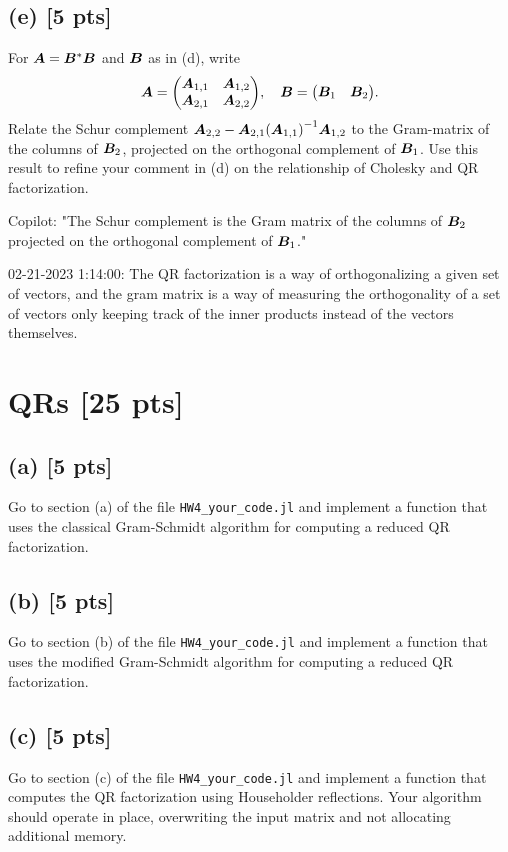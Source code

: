 \documentclass[twoside,10pt]{article}
\begin{document}
\subsection*{(e) [5 pts]} 
For $\bm{A} = \bm{B}^* \bm{B}$ and $\bm{B}$ as in (d), write 
\begin{equation}
\mtx{A} = 
\begin{pmatrix}
 \mtx{A}_{1,1}& \mtx{A}_{1,2} \\
 \mtx{A}_{2,1}& \mtx{A}_{2,2} 
\end{pmatrix}, 
\quad 
\mtx{B} = 
\begin{pmatrix}
 \mtx{B}_{1} &  \mtx{B}_{2} 
\end{pmatrix}. 
\end{equation}
Relate the Schur complement $\mtx{A}_{2,2} - \mtx{A}_{2,1} \left(\mtx{A}_{1, 1}\right)^{-1} \mtx{A}_{1,2}$ to the Gram-matrix of the columns of $\bm{B}_2$, projected on the orthogonal complement of $\bm{B}_1$.
Use this result to refine your comment in (d) on the relationship of Cholesky and QR factorization. 

Copilot: "The Schur complement is the Gram matrix of the columns of $\bm{B}_2$ projected on the orthogonal complement of $\bm{B}_1$."

02-21-2023 1:14:00: The QR factorization is a way of orthogonalizing a given set of vectors, and the gram matrix is a way of measuring the orthogonality of a set of vectors only keeping track of the inner products instead of the vectors themselves.

\section{QRs [25 pts]}
\subsection*{(a) [5 pts]} 
Go to section (a) of the file \texttt{HW4\_your\_code.jl} and implement a function that uses the classical Gram-Schmidt algorithm for computing a reduced QR factorization. 

\subsection*{(b) [5 pts]} 
Go to section (b) of the file \texttt{HW4\_your\_code.jl} and implement a function that uses the modified Gram-Schmidt algorithm for computing a reduced QR factorization. 


\subsection*{(c) [5 pts]}
Go to section (c) of the file \texttt{HW4\_your\_code.jl} and implement a function that computes the QR factorization using Householder reflections. 
Your algorithm should operate in place, overwriting the input matrix and not allocating additional memory. 
\end{document}
